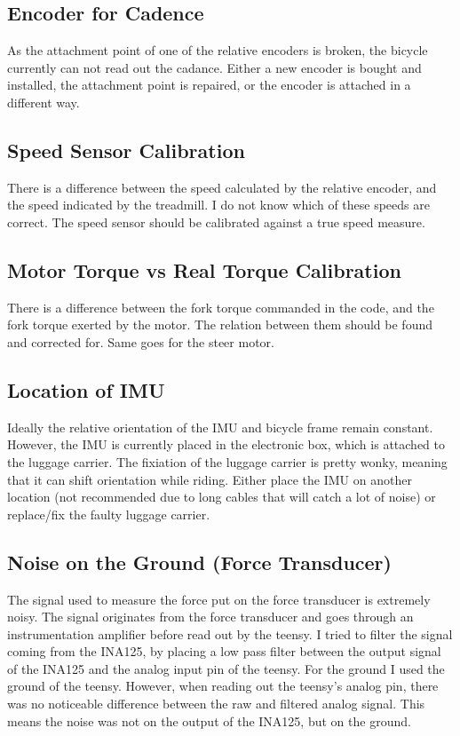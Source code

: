 \subsection{Encoder for Cadence}
As the attachment point of one of the relative encoders is broken, the bicycle currently can not read out the cadance.
Either a new encoder is bought and installed, the attachment point is repaired, or the encoder is attached in a different way.

\subsection{Speed Sensor Calibration}
There is a difference between the speed calculated by the relative encoder, and the speed indicated by the treadmill.
I do not know which of these speeds are correct.
The speed sensor should be calibrated against a true speed measure.

\subsection{Motor Torque vs Real Torque Calibration}
There is a difference between the fork torque commanded in the code, and the fork torque exerted by the motor.
The relation between them should be found and corrected for. Same goes for the steer motor.

\subsection{Location of IMU}
Ideally the relative orientation of the IMU and bicycle frame remain constant.
However, the IMU is currently placed in the electronic box, which is attached to the luggage carrier.
The fixiation of the luggage carrier is pretty wonky, meaning that it can shift orientation while riding.
Either place the IMU on another location (not recommended due to long cables that will catch a lot of noise) or replace/fix the faulty luggage carrier.

\subsection{Noise on the Ground (Force Transducer)} \label{sec:noise_on_ground}
The signal used to measure the force put on the force transducer is extremely noisy.
The signal originates from the force transducer and goes through an instrumentation amplifier before read out by the teensy.
I tried to filter the signal coming from the INA125, by placing a low pass filter between the output signal of the INA125 and the analog input pin of the teensy.
For the ground I used the ground of the teensy.
However, when reading out the teensy's analog pin, there was no noticeable difference between the raw and filtered analog signal.
This means the noise was not on the output of the INA125, but on the ground.


